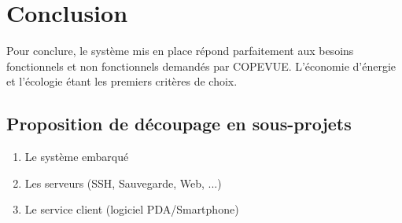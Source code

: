 \section{Conclusion}

Pour conclure, le système mis en place répond parfaitement aux besoins 
fonctionnels et non fonctionnels demandés par COPEVUE. L'économie d'énergie et 
l'écologie étant les premiers critères de choix.

\subsection{Proposition de découpage en sous-projets}

\begin{enumerate}
\item Le système embarqué
\item Les serveurs (SSH, Sauvegarde, Web, ...)
\item Le service client (logiciel PDA/Smartphone) 
\end {enumerate}

